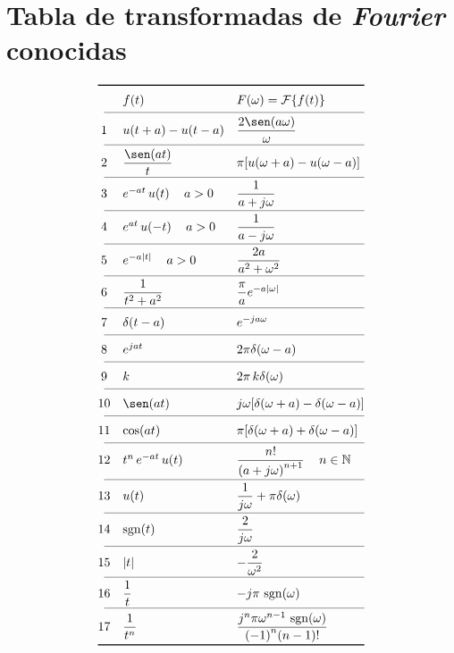 \section{Tabla de transformadas de \emph{Fourier} conocidas}

\begin{equation*}
\def\arraystretch{1.4}
\begin{array}{@{}cll@{}}
\toprule
 & f(t) & F(\omega)=\mathcal{F}\{f(t)\}\\
\cmidrule(l){1-3}
 1 & u(t+a)-u(t-a)
   & \dfrac{2\sen(a\omega)}{\omega}\\
\cmidrule(l){1-3}
 2 & \dfrac{\sen(at)}{t}
   & \pi[u(\omega+a)-u(\omega-a)]\\
\cmidrule(l){1-3}
 3 & e^{-at}\,u(t)\quad\,a>0
   & \dfrac{1}{a+j\omega}\\
\cmidrule(l){1-3}
 4 & e^{at}\,u(-t)\quad\,a>0
   & \dfrac{1}{a-j\omega}\\
\cmidrule(l){1-3}
 5 & e^{-a|t|}\quad\,a>0
   & \dfrac{2a}{a^2+\omega^2}\\
\cmidrule(l){1-3}
 6 & \dfrac{1}{t^2+a^2}
   & \dfrac{\pi}{a}e^{-a|\omega|}\\
\cmidrule(l){1-3}
 7 & \delta(t-a)
   & e^{-ja\omega}\\
\cmidrule(l){1-3}
 8 & e^{jat}
   & 2\pi\delta(\omega-a)\\
\cmidrule(l){1-3}
 9 & k
   & 2\pi\,k\delta(\omega)\\
\cmidrule(l){1-3}
10 & \sen(at)
   & j\omega[\delta(\omega+a)-\delta(\omega-a)]\\
\cmidrule(l){1-3}
11 & \cos(at)
   & \pi[\delta(\omega+a)+\delta(\omega-a)]\\
\cmidrule(l){1-3}
12 & t^n\,e^{-at}\,u(t)
   & \dfrac{n!}{{(a+j\omega)}^{n+1}}\quad\,n\in\mathbb{N}\\
\cmidrule(l){1-3}
13 & u(t)
   & \dfrac{1}{j\omega}+\pi\delta(\omega)\\
\cmidrule(l){1-3}
14 & \sgn(t)
   & \dfrac{2}{j\omega}\\
\cmidrule(l){1-3}
15 & |t|
   & -\dfrac{2}{\omega^2}\\
\cmidrule(l){1-3}
16 & \dfrac{1}{t}
   & -j\pi\,\sgn(\omega)\\
\cmidrule(l){1-3}
17 & \dfrac{1}{t^n}
   & \dfrac{j^n\pi{\omega}^{n-1}\,\sgn(\omega)}{{(-1)}^n(n-1)!}\\
\bottomrule
\end{array}
\end{equation*}


